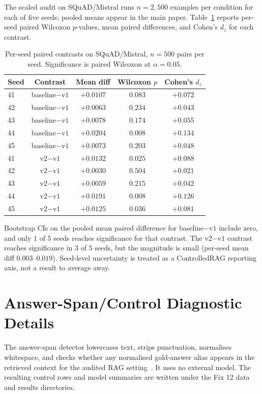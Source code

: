 \documentclass[11pt]{article}
\begin{document}
The scaled audit on SQuAD/Mistral runs $n=2{,}500$ examples per
condition for each of five seeds; pooled means appear in the main
paper. Table~\ref{tab:supp:scaled_per_seed} reports per-seed paired
Wilcoxon $p$-values, mean paired differences, and Cohen's $d_z$ for
each contrast.

\begin{table}[!htb]
\centering
\caption{Per-seed paired contrasts on SQuAD/Mistral, $n=500$ pairs per
seed. Significance is paired Wilcoxon at $\alpha=0.05$.}
\label{tab:supp:scaled_per_seed}
\footnotesize
\begin{tabular}{lcccc}
\toprule
Seed & Contrast & Mean diff & Wilcoxon $p$ & Cohen's $d_z$ \\
\midrule
41 & baseline$-$v$1$ & $+0.0107$ & $0.083$ & $+0.072$ \\
42 & baseline$-$v$1$ & $+0.0063$ & $0.234$ & $+0.043$ \\
43 & baseline$-$v$1$ & $+0.0078$ & $0.174$ & $+0.055$ \\
44 & baseline$-$v$1$ & $+0.0204$ & $\mathbf{0.008}$ & $+0.134$ \\
45 & baseline$-$v$1$ & $+0.0073$ & $0.203$ & $+0.048$ \\
\midrule
41 & v$2$$-$v$1$ & $+0.0132$ & $\mathbf{0.025}$ & $+0.088$ \\
42 & v$2$$-$v$1$ & $+0.0030$ & $0.504$ & $+0.021$ \\
43 & v$2$$-$v$1$ & $+0.0059$ & $0.215$ & $+0.042$ \\
44 & v$2$$-$v$1$ & $+0.0191$ & $\mathbf{0.008}$ & $+0.126$ \\
45 & v$2$$-$v$1$ & $+0.0125$ & $\mathbf{0.036}$ & $+0.081$ \\
\bottomrule
\end{tabular}
\end{table}

Bootstrap CIs on the pooled mean paired difference for
baseline$-$v$1$ include zero, and only $1$ of $5$ seeds reaches
significance for that contrast. The v$2$$-$v$1$ contrast reaches
significance in $3$ of $5$ seeds, but the magnitude is small (per-seed
mean diff $0.003$--$0.019$). Seed-level uncertainty is treated as a
ControlledRAG reporting axis, not a result to average away.

\section{Answer-Span/Control Diagnostic Details}
\label{supp:span}

The answer-span detector lowercases text, strips punctuation,
normalises whitespace, and checks whether any normalised gold-answer
alias appears in the retrieved context for the audited RAG
setting~\citep{lewis2020rag}. It uses no external model. The resulting
control rows and model summaries are written under the Fix 12 data and
results directories.
\end{document}
